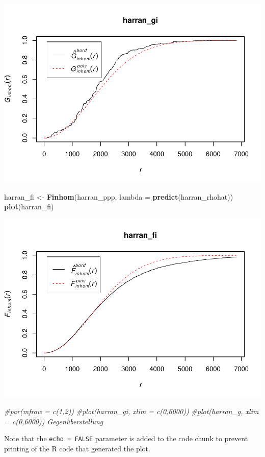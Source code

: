 \documentclass[]{article}
\newenvironment{Shaded}{\begin{snugshade}}{\end{snugshade}}
\newcommand{\KeywordTok}[1]{\textcolor[rgb]{0.13,0.29,0.53}{\textbf{{#1}}}}
\newcommand{\DataTypeTok}[1]{\textcolor[rgb]{0.13,0.29,0.53}{{#1}}}
\newcommand{\StringTok}[1]{\textcolor[rgb]{0.31,0.60,0.02}{{#1}}}
\newcommand{\CommentTok}[1]{\textcolor[rgb]{0.56,0.35,0.01}{\textit{{#1}}}}
\newcommand{\NormalTok}[1]{{#1}}
\begin{document}
\includegraphics{HarranPlain_files/figure-latex/unnamed-chunk-11-1.pdf}

\begin{Shaded}
\begin{Highlighting}[]
\NormalTok{harran_fi <-}\StringTok{ }\KeywordTok{Finhom}\NormalTok{(harran_ppp, }\DataTypeTok{lambda =} \KeywordTok{predict}\NormalTok{(harran_rhohat))}
\KeywordTok{plot}\NormalTok{(harran_fi)}
\end{Highlighting}
\end{Shaded}

\includegraphics{HarranPlain_files/figure-latex/unnamed-chunk-11-2.pdf}

\begin{Shaded}
\begin{Highlighting}[]
\CommentTok{#par(mfrow = c(1,2))}
\CommentTok{#plot(harran_gi, xlim = c(0,6000))}
\CommentTok{#plot(harran_g, xlim = c(0,6000))      Gegenüberstellung }
\end{Highlighting}
\end{Shaded}

Note that the \texttt{echo\ =\ FALSE} parameter is added to the code
chunk to prevent printing of the R code that generated the plot.
\end{document}
